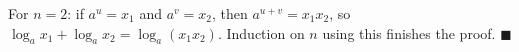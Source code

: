 For $n=2$: if $a^{u}=x_1$ and $a^{v}=x_2$, then $a^{u+v}=x_1x_2$, so $\log_ax_1+\log_ax_2=\log_a(x_1x_2)$. Induction on $n$ using this finishes the proof. $\blacksquare$
